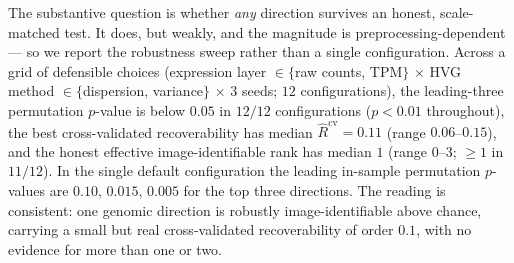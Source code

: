 \documentclass{article}
\begin{document}
The substantive question is whether \emph{any} direction survives an honest,
scale-matched test. It does, but weakly, and the magnitude is
preprocessing-dependent --- so we report the
robustness sweep rather than a single configuration. Across a grid of
defensible choices (expression layer $\in\{$raw counts, TPM$\}$ $\times$
HVG method $\in\{$dispersion, variance$\}$ $\times$ $3$ seeds; $12$
configurations), the leading-three permutation $p$-value is below $0.05$ in
\textbf{$12/12$} configurations ($p<0.01$ throughout), the best cross-validated
recoverability has median $\hat R^{\mathrm{cv}} = 0.11$ (range $0.06$--$0.15$),
and the honest effective image-identifiable rank has median $1$ (range $0$--$3$;
$\ge 1$ in $11/12$). In the single default configuration the leading in-sample
permutation $p$-values are $0.10,\,0.015,\,0.005$ for the top three directions.
The reading is consistent: one genomic direction is robustly image-identifiable
above chance, carrying a small but real cross-validated recoverability of order
$0.1$, with no evidence for more than one or two.
\end{document}
